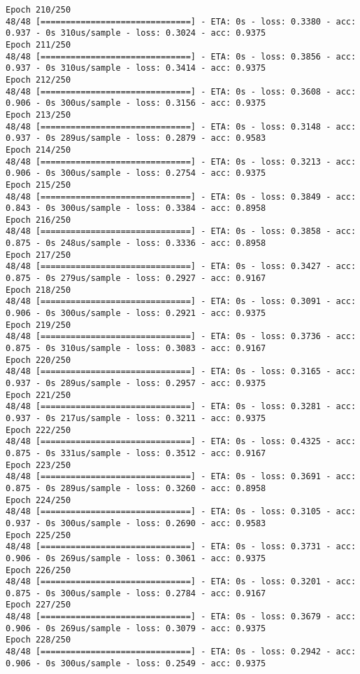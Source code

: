 \documentclass[11pt]{article}
\begin{document}
\begin{Verbatim}[commandchars=\\\{\}]
Epoch 210/250
48/48 [==============================] - ETA: 0s - loss: 0.3380 - acc: 0.937 - 0s 310us/sample - loss: 0.3024 - acc: 0.9375
Epoch 211/250
48/48 [==============================] - ETA: 0s - loss: 0.3856 - acc: 0.937 - 0s 310us/sample - loss: 0.3414 - acc: 0.9375
Epoch 212/250
48/48 [==============================] - ETA: 0s - loss: 0.3608 - acc: 0.906 - 0s 300us/sample - loss: 0.3156 - acc: 0.9375
Epoch 213/250
48/48 [==============================] - ETA: 0s - loss: 0.3148 - acc: 0.937 - 0s 289us/sample - loss: 0.2879 - acc: 0.9583
Epoch 214/250
48/48 [==============================] - ETA: 0s - loss: 0.3213 - acc: 0.906 - 0s 300us/sample - loss: 0.2754 - acc: 0.9375
Epoch 215/250
48/48 [==============================] - ETA: 0s - loss: 0.3849 - acc: 0.843 - 0s 300us/sample - loss: 0.3384 - acc: 0.8958
Epoch 216/250
48/48 [==============================] - ETA: 0s - loss: 0.3858 - acc: 0.875 - 0s 248us/sample - loss: 0.3336 - acc: 0.8958
Epoch 217/250
48/48 [==============================] - ETA: 0s - loss: 0.3427 - acc: 0.875 - 0s 279us/sample - loss: 0.2927 - acc: 0.9167
Epoch 218/250
48/48 [==============================] - ETA: 0s - loss: 0.3091 - acc: 0.906 - 0s 300us/sample - loss: 0.2921 - acc: 0.9375
Epoch 219/250
48/48 [==============================] - ETA: 0s - loss: 0.3736 - acc: 0.875 - 0s 310us/sample - loss: 0.3083 - acc: 0.9167
Epoch 220/250
48/48 [==============================] - ETA: 0s - loss: 0.3165 - acc: 0.937 - 0s 289us/sample - loss: 0.2957 - acc: 0.9375
Epoch 221/250
48/48 [==============================] - ETA: 0s - loss: 0.3281 - acc: 0.937 - 0s 217us/sample - loss: 0.3211 - acc: 0.9375
Epoch 222/250
48/48 [==============================] - ETA: 0s - loss: 0.4325 - acc: 0.875 - 0s 331us/sample - loss: 0.3512 - acc: 0.9167
Epoch 223/250
48/48 [==============================] - ETA: 0s - loss: 0.3691 - acc: 0.875 - 0s 289us/sample - loss: 0.3260 - acc: 0.8958
Epoch 224/250
48/48 [==============================] - ETA: 0s - loss: 0.3105 - acc: 0.937 - 0s 300us/sample - loss: 0.2690 - acc: 0.9583
Epoch 225/250
48/48 [==============================] - ETA: 0s - loss: 0.3731 - acc: 0.906 - 0s 269us/sample - loss: 0.3061 - acc: 0.9375
Epoch 226/250
48/48 [==============================] - ETA: 0s - loss: 0.3201 - acc: 0.875 - 0s 300us/sample - loss: 0.2784 - acc: 0.9167
Epoch 227/250
48/48 [==============================] - ETA: 0s - loss: 0.3679 - acc: 0.906 - 0s 269us/sample - loss: 0.3079 - acc: 0.9375
Epoch 228/250
48/48 [==============================] - ETA: 0s - loss: 0.2942 - acc: 0.906 - 0s 300us/sample - loss: 0.2549 - acc: 0.9375

\end{Verbatim}
\end{document}
